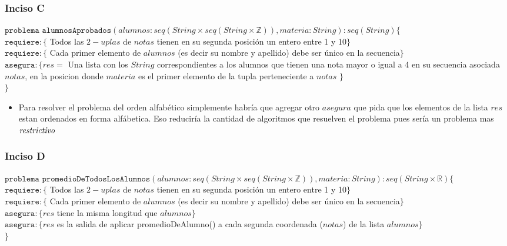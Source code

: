 	\subsubsection{Inciso C}
	$\texttt{problema alumnosAprobados}(alumnos:seq(String \times seq(String \times \mathbb{Z})),materia:String) : seq(String) \lbrace$\\
	$\texttt{requiere}:\lbrace$ Todos las $2-uplas$ de $notas$ tienen en su segunda posición un entero entre 1 y 10$\rbrace$\\
	$\texttt{requiere}:\lbrace$ Cada primer elemento de $alumnos$ (es decir su nombre y apellido) debe ser único en la secuencia$\rbrace$\\
	$\texttt{asegura}:\lbrace res=$ Una lista con los $String$ correspondientes a los alumnos que tienen una nota mayor o igual a 4 en su secuencia asociada $notas$, en la posicion donde $materia$ es el primer elemento de la tupla perteneciente a $notas$ $\rbrace$\\
	$\rbrace$\\
	\begin{itemize}
	\item Para resolver el problema del orden alfabético simplemente habría que agregar otro $asegura$ que pida que los elementos de la lista $res$ estan ordenados en forma alfábetica. Eso reduciría la cantidad de algoritmos que resuelven el problema pues sería un problema mas $\emph{restrictivo}$
	\end{itemize}
	
	\subsubsection{Inciso D}
	$\texttt{problema promedioDeTodosLosAlumnos}(alumnos:seq(String \times seq(String \times \mathbb{Z})),materia:String) : seq(String \times \mathbb{R}) \lbrace$\\
	$\texttt{requiere}:\lbrace$ Todos las $2-uplas$ de $notas$ tienen en su segunda posición un entero entre 1 y 10$\rbrace$\\
	$\texttt{requiere}:\lbrace$ Cada primer elemento de $alumnos$ (es decir su nombre y apellido) debe ser único en la secuencia$\rbrace$\\
	$\texttt{asegura}:\lbrace res$ tiene la misma longitud que $alumnos\rbrace$\\
	$\texttt{asegura}:\lbrace res$ es la salida de aplicar promedioDeAlumno() a cada segunda coordenada ($notas$) de la lista $alumnos\rbrace$\\
	$\rbrace$
